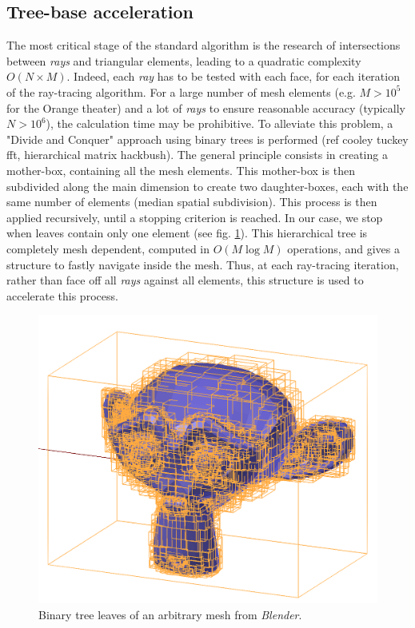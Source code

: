 \documentclass[AMA,STIX1COL]{WileyNJD-v2}
\begin{document}
\subsection{Tree-base acceleration}
\label{octree}
The most critical stage of the standard algorithm is the research of intersections between  \textit{rays} and triangular elements, leading to a quadratic complexity $O(N\times M)$. Indeed, each \textit{ray} has to be tested with each face, for each iteration of the ray-tracing algorithm. For a large number of mesh elements (e.g. $M>10^5$ for the Orange theater) and a lot of \textit{rays} to ensure reasonable accuracy (typically $N>10^6$), the calculation time may be prohibitive. To alleviate this problem, a "Divide and Conquer" approach using binary trees is performed (ref cooley tuckey fft, hierarchical matrix hackbush). The general principle consists in creating a mother-box, containing all the mesh elements. This mother-box is then subdivided along the main dimension to create two daughter-boxes, each with the same number of elements (median spatial subdivision). This process is then applied recursively, until a stopping criterion is reached. In our case, we stop when leaves contain only one element (see fig. \ref{octreeSuzanne}). This hierarchical tree is completely mesh dependent, computed in $O(M\log M)$ operations, and gives a structure to fastly navigate inside the mesh. Thus, at each ray-tracing iteration, rather than face off all \textit{rays} against all elements, this structure is used to accelerate this process. 

\begin{figure}[h]
\centering
		\includegraphics[width=0.5\linewidth]{octreeSuzanne}
		\caption{Binary tree leaves of an arbitrary mesh from \textit{Blender}.}
		\label{octreeSuzanne}
\end{figure}
\end{document}
